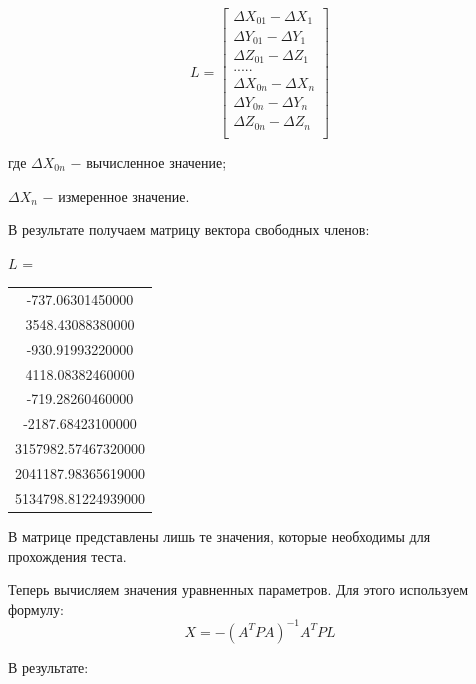 \documentclass[a4paper]{article}
\begin{document}
\begin{newpage}
\begin{equation}
L=
\begin{bmatrix}
    \Delta X_{01} - \Delta X_1\\
    \Delta Y_{01} - \Delta Y_1\\
    \Delta Z_{01} - \Delta Z_1\\
    ..... \\
    \Delta X_{0n} - \Delta X_n\\
    \Delta Y_{0n} - \Delta Y_n\\
    \Delta Z_{0n} - \Delta Z_n\\
\end{bmatrix}
\end{equation}
\par где $\Delta X_{0n}$ $-$  вычисленное значение;
\par $\Delta X_n$ $-$ измеренное значение.
\par В результате получаем матрицу вектора свободных членов:
\begin{center}
$L$ =
\begin{tabular}{|c|}
-737.06301450000\\
3548.43088380000\\
-930.91993220000\\
4118.08382460000\\
-719.28260460000\\
-2187.68423100000\\
3157982.57467320000\\
2041187.98365619000\\
5134798.81224939000\\
\end{tabular}
\end{center}
\par В матрице представлены лишь те значения, которые необходимы для прохождения теста.
\par Теперь вычисляем значения уравненных параметров. Для этого используем формулу:
\begin{equation}
    X = - (A^TPA)^{-1}A^TPL
\end{equation}
\par В результате:
\end{newpage}
\end{document}
